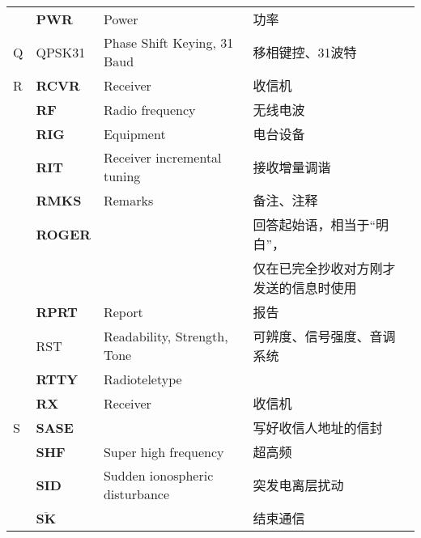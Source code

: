 \begin{longtable}[l]{llll}
    & \textbf{PWR}                      & Power                                   & 功率                  \\
  Q & QPSK31                            & Phase Shift Keying, 31 Baud             & 移相键控、31波特           \\
  R & \textbf{RCVR}                     & Receiver                                & 收信机                 \\
    & \textbf{RF}                       & Radio frequency                         & 无线电波                \\
    & \textbf{RIG}                      & Equipment                               & 电台设备                \\
    & \textbf{RIT}                      & Receiver incremental tuning             & 接收增量调谐              \\
    & \textbf{RMKS}                     & Remarks                                 & 备注、注释               \\
    & \textbf{ROGER}                    &                                         & 回答起始语，相当于“明白”，      \\
    &                                   &                                         & 仅在已完全抄收对方刚才发送的信息时使用 \\
    & \textbf{RPRT}                     & Report                                  & 报告                  \\
    & RST                               & Readability, Strength, Tone             & 可辨度、信号强度、音调系统       \\
    & \textbf{RTTY}                     & Radioteletype                           &                     \\
    & \textbf{RX}                       & Receiver                                & 收信机                 \\
  S & \textbf{SASE}                     &                                         & 写好收信人地址的信封          \\
    & \textbf{SHF}                      & Super high frequency                    & 超高频                 \\
    & \textbf{SID}                      & Sudden ionospheric disturbance          & 突发电离层扰动             \\
    & $\overline{\mathbf{S}\mathbf{K}}$ &                                         & 结束通信                \\

\end{longtable}
